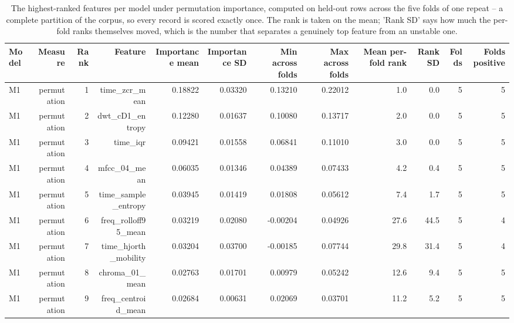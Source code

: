 \begin{table}[htbp]
  \centering
  \caption{The highest-ranked features per model under permutation importance, computed on held-out rows across the five folds of one repeat -- a complete partition of the corpus, so every record is scored exactly once. The rank is taken on the mean; 'Rank SD' says how much the per-fold ranks themselves moved, which is the number that separates a genuinely top feature from an unstable one.}
  \label{tab:fe-11}
  \begin{tabular}{lrrrrrrrrrrr}
    \toprule
    Model & Measure & Rank & Feature & Importance mean & Importance SD & Min across folds & Max across folds & Mean per-fold rank & Rank SD & Folds & Folds positive \\
    \midrule
    M1 & permutation & 1 & time\_zcr\_mean & 0.18822 & 0.03320 & 0.13210 & 0.22012 & 1.0 & 0.0 & 5 & 5 \\
    M1 & permutation & 2 & dwt\_cD1\_entropy & 0.12280 & 0.01637 & 0.10080 & 0.13717 & 2.0 & 0.0 & 5 & 5 \\
    M1 & permutation & 3 & time\_iqr & 0.09421 & 0.01558 & 0.06841 & 0.11010 & 3.0 & 0.0 & 5 & 5 \\
    M1 & permutation & 4 & mfcc\_04\_mean & 0.06035 & 0.01346 & 0.04389 & 0.07433 & 4.2 & 0.4 & 5 & 5 \\
    M1 & permutation & 5 & time\_sample\_entropy & 0.03945 & 0.01419 & 0.01808 & 0.05612 & 7.4 & 1.7 & 5 & 5 \\
    M1 & permutation & 6 & freq\_rolloff95\_mean & 0.03219 & 0.02080 & -0.00204 & 0.04926 & 27.6 & 44.5 & 5 & 4 \\
    M1 & permutation & 7 & time\_hjorth\_mobility & 0.03204 & 0.03700 & -0.00185 & 0.07744 & 29.8 & 31.4 & 5 & 4 \\
    M1 & permutation & 8 & chroma\_01\_mean & 0.02763 & 0.01701 & 0.00979 & 0.05242 & 12.6 & 9.4 & 5 & 5 \\
    M1 & permutation & 9 & freq\_centroid\_mean & 0.02684 & 0.00631 & 0.02069 & 0.03701 & 11.2 & 5.2 & 5 & 5 \\

\end{tabular}
\end{table}

